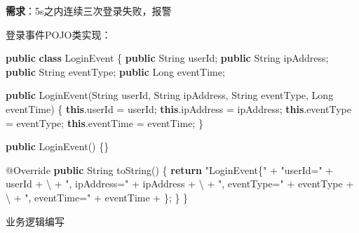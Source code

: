 \documentclass[cn,11pt,chinese]{elegantbook}
\newenvironment{Shaded}{}{}
\newcommand{\AttributeTok}[1]{\textcolor[rgb]{0.49,0.56,0.16}{#1}}
\newcommand{\BuiltInTok}[1]{#1}
\newcommand{\CharTok}[1]{\textcolor[rgb]{0.25,0.44,0.63}{#1}}
\newcommand{\FunctionTok}[1]{\textcolor[rgb]{0.02,0.16,0.49}{#1}}
\newcommand{\KeywordTok}[1]{\textcolor[rgb]{0.00,0.44,0.13}{\textbf{#1}}}
\newcommand{\NormalTok}[1]{#1}
\newcommand{\StringTok}[1]{\textcolor[rgb]{0.25,0.44,0.63}{#1}}
\begin{document}
\textbf{需求}：5s之内连续三次登录失败，报警

登录事件POJO类实现：

\begin{Shaded}
\begin{Highlighting}[]
\KeywordTok{public} \KeywordTok{class}\NormalTok{ LoginEvent \{}
    \KeywordTok{public} \BuiltInTok{String}\NormalTok{ userId;}
    \KeywordTok{public} \BuiltInTok{String}\NormalTok{ ipAddress;}
    \KeywordTok{public} \BuiltInTok{String}\NormalTok{ eventType;}
    \KeywordTok{public} \BuiltInTok{Long}\NormalTok{ eventTime;}
    
    \KeywordTok{public} \FunctionTok{LoginEvent}\NormalTok{(}\BuiltInTok{String}\NormalTok{ userId, }\BuiltInTok{String}\NormalTok{ ipAddress, }\BuiltInTok{String}\NormalTok{ eventType, }\BuiltInTok{Long}\NormalTok{ eventTime) \{}
        \KeywordTok{this}\NormalTok{.}\FunctionTok{userId}\NormalTok{ = userId;}
        \KeywordTok{this}\NormalTok{.}\FunctionTok{ipAddress}\NormalTok{ = ipAddress;}
        \KeywordTok{this}\NormalTok{.}\FunctionTok{eventType}\NormalTok{ = eventType;}
        \KeywordTok{this}\NormalTok{.}\FunctionTok{eventTime}\NormalTok{ = eventTime;}
\NormalTok{    \}}
    
    \KeywordTok{public} \FunctionTok{LoginEvent}\NormalTok{() \{\}}
    
    \AttributeTok{@Override}
    \KeywordTok{public} \BuiltInTok{String} \FunctionTok{toString}\NormalTok{() \{}
        \KeywordTok{return} \StringTok{"LoginEvent\{"}\NormalTok{ +}
            \StringTok{"userId=\textquotesingle{}"}\NormalTok{ + userId + }\CharTok{\textquotesingle{}\textbackslash{}\textquotesingle{}\textquotesingle{}}\NormalTok{ +}
            \StringTok{", ipAddress=\textquotesingle{}"}\NormalTok{ + ipAddress + }\CharTok{\textquotesingle{}\textbackslash{}\textquotesingle{}\textquotesingle{}}\NormalTok{ +}
            \StringTok{", eventType=\textquotesingle{}"}\NormalTok{ + eventType + }\CharTok{\textquotesingle{}\textbackslash{}\textquotesingle{}\textquotesingle{}}\NormalTok{ +}
            \StringTok{", eventTime="}\NormalTok{ + eventTime +}
            \CharTok{\textquotesingle{}\}\textquotesingle{}}\NormalTok{;}
\NormalTok{    \}}
\NormalTok{\}}
\end{Highlighting}
\end{Shaded}

业务逻辑编写
\end{document}
